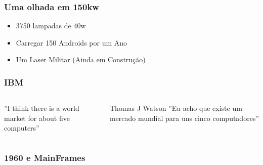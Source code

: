 \documentclass{beamer}
\begin{document}
\begin{frame} \frametitle{Uma olhada em 150kw}
    \begin{itemize}
    \item 3750 lampadas de 40w
    \item Carregar 150 Androids por um Ano
    \item Um Laser Militar (Ainda em Construção)
    \end{itemize}
\end{frame}

\begin{frame} \frametitle{IBM}
    \begin{columns}
        ''I think there is a world market for about five computers''

        Thomas J Watson
        \pause
        ''Eu acho que existe um mercado mundial para uns cinco computadores''
    \end{columns}
\end{frame}

\begin{frame} \frametitle{1960 e MainFrames}

\end{frame}
\end{document}

